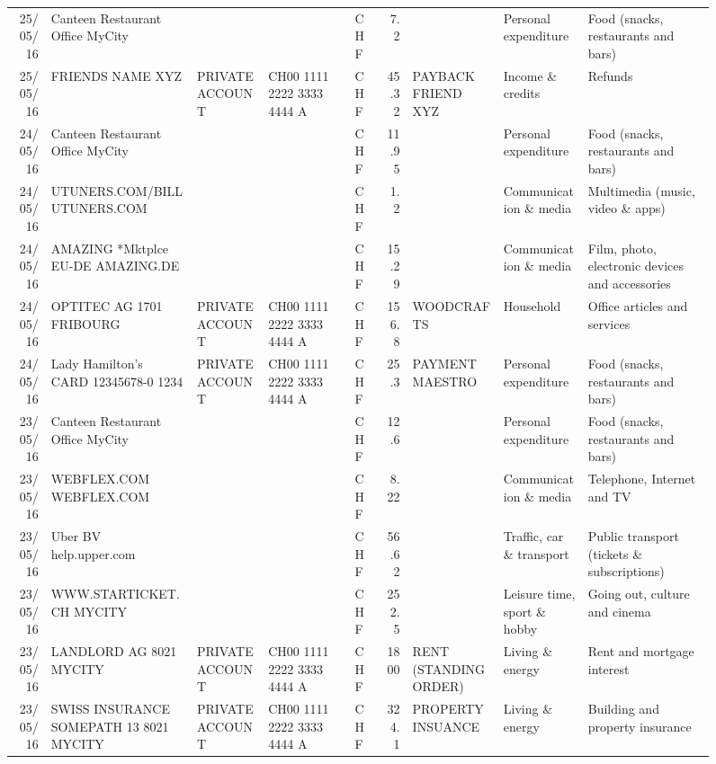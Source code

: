 \begin{landscape}
\begin{sidewaysfigure}
\begin{table}[h]
\begin{center}
\begin{tabular}{rllllrlll}
		25/05/16 & Canteen Restaurant Office      MyCity &       &       & CHF   & 7.2   &       & Personal expenditure & Food (snacks, restaurants and bars) \\
		25/05/16 & FRIENDS NAME XYZ & PRIVATE ACCOUNT & CH00 1111 2222 3333 4444 A & CHF   & 45.32 & PAYBACK FRIEND XYZ & Income \& credits & Refunds \\
		24/05/16 & Canteen Restaurant Office      MyCity &       &       & CHF   & 11.95 &       & Personal expenditure & Food (snacks, restaurants and bars) \\
		24/05/16 & UTUNERS.COM/BILL          UTUNERS.COM &       &       & CHF   & 1.2   &       & Communication \& media & Multimedia (music, video \& apps) \\
		24/05/16 & AMAZING *Mktplce EU-DE    AMAZING.DE &       &       & CHF   & 15.29 &       & Communication \& media & Film, photo, electronic devices and accessories \\
		24/05/16 & OPTITEC AG 1701 FRIBOURG & PRIVATE ACCOUNT & CH00 1111 2222 3333 4444 A & CHF   & 156.8 & WOODCRAFTS & Household & Office articles and services \\
		24/05/16 & Lady Hamilton's CARD 12345678-0 1234 & PRIVATE ACCOUNT & CH00 1111 2222 3333 4444 A & CHF   & 25.3  & PAYMENT MAESTRO & Personal expenditure & Food (snacks, restaurants and bars) \\
		23/05/16 & Canteen Restaurant Office      MyCity &       &       & CHF   & 12.6  &       & Personal expenditure & Food (snacks, restaurants and bars) \\
		23/05/16 & WEBFLEX.COM              WEBFLEX.COM &       &       & CHF   & 8.22  &       & Communication \& media & Telephone,  Internet and TV \\
		23/05/16 & Uber BV                  help.upper.com &       &       & CHF   & 56.62 &       & Traffic, car \& transport & Public transport (tickets \& subscriptions) \\
		23/05/16 & WWW.STARTICKET.CH        MYCITY &       &       & CHF   & 252.5 &       & Leisure time, sport \& hobby & Going out, culture and cinema \\
		23/05/16 & LANDLORD AG 8021 MYCITY & PRIVATE ACCOUNT & CH00 1111 2222 3333 4444 A & CHF   & 1800  & RENT (STANDING ORDER) & Living \& energy & Rent and mortgage interest \\
		23/05/16 & SWISS INSURANCE SOMEPATH 13 8021 MYCITY & PRIVATE ACCOUNT & CH00 1111 2222 3333 4444 A & CHF   & 324.1 & PROPERTY INSUANCE & Living \& energy & Building and property insurance \\

\end{tabular}
\end{center}
\end{table}
\end{sidewaysfigure}
\end{landscape}
